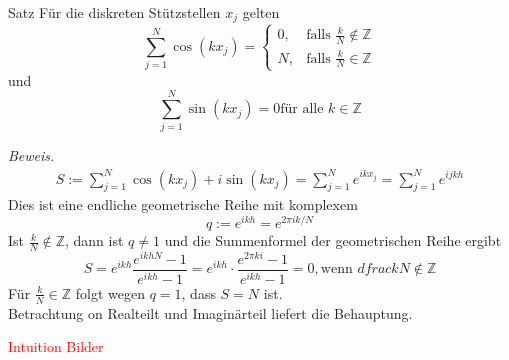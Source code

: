 \begin{thmbox}{Satz}
    Für die diskreten Stützstellen $x_j$ gelten
    \[
        \sum_{j=1}^N \cos(kx_j) = \begin{cases}
            0, & \text{falls } \tfrac{k}{N}\notin\mathbb{Z} \\
            N, & \text{falls } \tfrac{k}{N}\in\mathbb{Z}
        \end{cases} 
    \]
    und 
    \[
        \sum_{j=1}^N \sin(kx_j) = 0 \text{für alle } k\in\mathbb{Z}
    \]
\end{thmbox}
\textit{Beweis.}
\begin{align*}
    S := \sum_{j=1}^{N} \cos(kx_j) + i\sin(kx_j) = \sum_{j=1}^{N} e^{ikx_j} = \sum_{j=1}^{N} e^{ijkh}
\end{align*}
Dies ist eine endliche geometrische Reihe mit komplexem 
\[
    q := e^{ikh} = e^{2\pi ik/N}
\]
Ist $\tfrac{k}{N}\notin\mathbb{Z}$, dann ist $q\neq 1$ und die Summenformel der geometrischen Reihe ergibt 
\[
     S = e^{ikh}\dfrac{e^{ikhN}-1}{e^{ikh}-1} = e^{ikh}\cdot\dfrac{e^{2\pi ki}-1}{e^{ikh}-1} = 0, \text{wenn } dfrac{k}{N}\notin\mathbb{Z}
\]
Für $\tfrac{k}{N}\in\mathbb{Z}$ folgt wegen $q=1$, dass $S=N$ ist. \\
Betrachtung on Realteilt und Imaginärteil liefert die Behauptung.

\textcolor{red}{Intuition Bilder}

